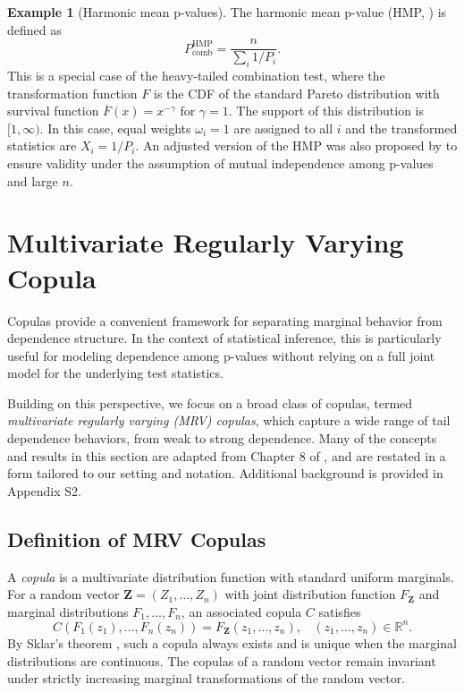 \documentclass[12pt]{article}
\theoremstyle{plain}
\theoremstyle{plain}
\theoremstyle{definition}
\newtheorem{exmp}{Example}[section]
\newcommand{\R}{\mathbb{R}}
\begin{document}
\begin{exmp}[Harmonic mean p-values] 
\label{exmp:harmonic_mean}
The harmonic mean p-value (HMP, \citet{wilson2019harmonic}) is defined as 
$$P_{\mathrm{comb}}^{\mathrm{HMP}} = \frac{n}{\sum_i 1/P_i}.$$
This is a special case of the heavy-tailed combination test, where the transformation function $F$ is the CDF of the standard Pareto distribution with survival function $\overline{F}(x) = x^{-\gamma}$ for $\gamma = 1$. The support of this distribution is $[1, \infty)$. In this case, equal weights $\omega_i = 1$ are assigned to all $i$ and the transformed statistics are $X_i = 1/P_i$.
An adjusted version of the HMP was also proposed by \citet{wilson2019harmonic} to ensure validity under the assumption of mutual independence among p-values and large $n$.
\end{exmp}




\section{Multivariate Regularly Varying Copula}
Copulas provide a convenient framework for separating marginal behavior from dependence structure. In the context of statistical inference, this is particularly useful for modeling dependence among p-values without relying on a full joint model for the underlying test statistics.

Building on this perspective, we focus on a broad class of copulas, termed \emph{multivariate regularly varying (MRV) copulas}, which capture a wide range of tail dependence behaviors, from weak to strong dependence. Many of the concepts and results in this section are adapted from Chapter 8 of \citet{beirlant2006statistics}, and are restated in a form tailored to our setting and notation. Additional background is provided in Appendix S2.






\subsection{Definition of MRV Copulas}
A \emph{copula} is a multivariate distribution function with standard uniform marginals. For a random vector $\mathbf{Z} = (Z_1, \dots, Z_n)$ with joint distribution function $F_{\mathbf{Z}}$ and marginal distributions $F_1, \dots, F_n$, an associated copula $C$ satisfies
$$
C(F_1(z_1) ,\dots,F_n(z_n))= F_{\mathbf{Z}}(z_1,\dots, z_n),~~~~(z_1,\dots,z_n)\in \R^n.
$$
By Sklar's theorem \citep{sklar1959fonctions}, such a copula always exists and is unique when the marginal distributions are continuous. The copulas of a random vector remain invariant under strictly increasing marginal transformations of the random vector. %
\end{document}
